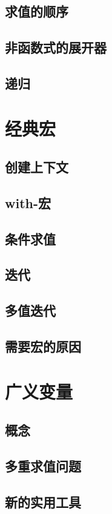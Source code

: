 \documentclass{ctexart}
\begin{document}
\subsection{求值的顺序}
\label{sec-10-2}
\subsection{非函数式的展开器}
\label{sec-10-3}
\subsection{递归}
\label{sec-10-4}
\section{经典宏}
\label{sec-11}
\subsection{创建上下文}
\label{sec-11-1}
\subsection{with-宏}
\label{sec-11-2}
\subsection{条件求值}
\label{sec-11-3}
\subsection{迭代}
\label{sec-11-4}
\subsection{多值迭代}
\label{sec-11-5}
\subsection{需要宏的原因}
\label{sec-11-6}
\section{广义变量}
\label{sec-12}
\subsection{概念}
\label{sec-12-1}
\subsection{多重求值问题}
\label{sec-12-2}
\subsection{新的实用工具}
\label{sec-12-3}
\end{document}
